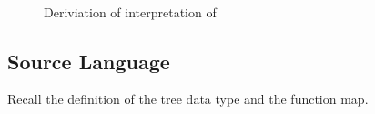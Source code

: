 \begin{figure}
  \label{fig:ws_map_interpretation_derivation}
  \caption{Deriviation of interpretation of }
\[ \begin{split}
\end{split} \]
\end{figure}


\subsection*{Source Language}
Recall the definition of the tree data type and the function map.

